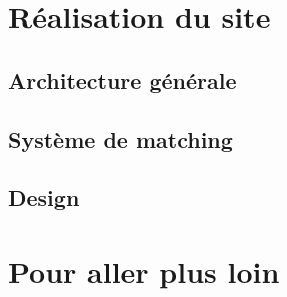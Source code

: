 \documentclass{article}
\begin{document}
\newpage
\section{Réalisation du site}

\subsection{Architecture générale}


\subsection{Système de matching}

\subsection{Design}

\section{Pour aller plus loin}
\end{document}
